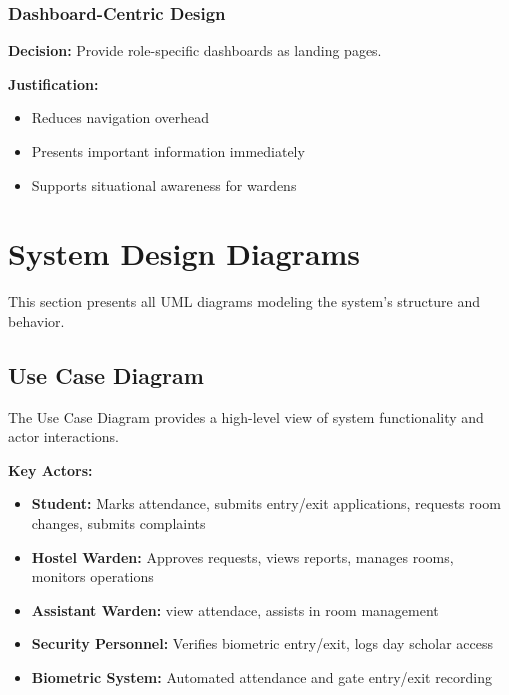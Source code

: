 \documentclass[12pt]{article}
\begin{document}
\subsubsection{Dashboard-Centric Design}

\textbf{Decision:} Provide role-specific dashboards as landing pages.

\textbf{Justification:}

\begin{itemize}
\item Reduces navigation overhead
\item Presents important information immediately
\item Supports situational awareness for wardens
\end{itemize}

\newpage
\section{System Design Diagrams}

This section presents all UML diagrams modeling the system's structure and behavior.

\subsection{Use Case Diagram}

The Use Case Diagram provides a high-level view of system functionality and actor interactions.

\textbf{Key Actors:}

\begin{itemize}
\item \textbf{Student:} Marks attendance, submits entry/exit applications, requests room changes, submits complaints
\item \textbf{Hostel Warden:} Approves requests, views reports, manages rooms, monitors operations
\item \textbf{Assistant Warden:} view attendace, assists in room management
\item \textbf{Security Personnel:} Verifies biometric entry/exit, logs day scholar access
\item \textbf{Biometric System:} Automated attendance and gate entry/exit recording
\end{itemize}
\end{document}
